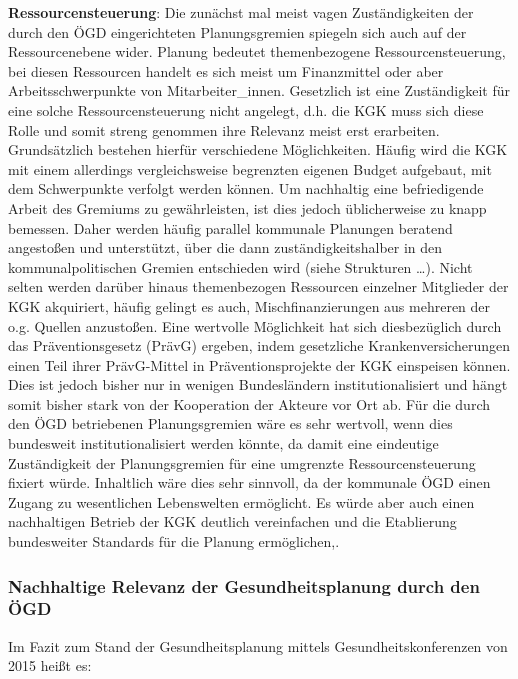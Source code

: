 \documentclass{article}
\begin{document}
\textbf{Ressourcensteuerung}: Die zunächst mal meist vagen Zuständigkeiten der durch den ÖGD eingerichteten Planungsgremien spiegeln sich auch auf der Ressourcenebene wider\autocite{Hollederer2014}. Planung bedeutet themenbezogene Ressourcensteuerung, bei diesen Ressourcen handelt es sich meist um Finanzmittel oder aber Arbeitsschwerpunkte von Mitarbeiter\_innen. Gesetzlich ist eine Zuständigkeit für eine solche Ressourcensteuerung nicht angelegt, d.h. die KGK muss sich diese Rolle und somit streng genommen ihre Relevanz meist erst erarbeiten. Grundsätzlich bestehen hierfür verschiedene Möglichkeiten. Häufig wird die KGK mit einem allerdings vergleichsweise begrenzten eigenen Budget aufgebaut, mit dem Schwerpunkte verfolgt werden können. Um nachhaltig eine befriedigende Arbeit des Gremiums zu gewährleisten, ist dies jedoch üblicherweise zu knapp bemessen. Daher werden häufig parallel kommunale Planungen beratend angestoßen und unterstützt, über die dann zuständigkeitshalber in den kommunalpolitischen Gremien entschieden wird (siehe Strukturen …). Nicht selten werden darüber hinaus themenbezogen Ressourcen einzelner Mitglieder der KGK akquiriert, häufig gelingt es auch, Mischfinanzierungen aus mehreren der o.g. Quellen anzustoßen. Eine wertvolle Möglichkeit hat sich diesbezüglich durch das Präventionsgesetz (PrävG) ergeben, indem gesetzliche Krankenversicherungen einen Teil ihrer PrävG-Mittel in Präventionsprojekte der KGK einspeisen können. Dies ist jedoch bisher nur in wenigen Bundesländern institutionalisiert und hängt somit bisher stark von der Kooperation der Akteure vor Ort ab. Für die durch den ÖGD betriebenen Planungsgremien wäre es sehr wertvoll, wenn dies bundesweit institutionalisiert werden könnte, da damit eine eindeutige Zuständigkeit der Planungsgremien für eine umgrenzte Ressourcensteuerung fixiert würde. Inhaltlich wäre dies sehr sinnvoll, da der kommunale ÖGD einen Zugang zu wesentlichen Lebenswelten ermöglicht. Es würde aber auch einen nachhaltigen Betrieb der KGK deutlich vereinfachen und die Etablierung bundesweiter Standards für die Planung ermöglichen\autocite{Szagunundweitere2016},\autocite{Starkeundweitere2018}.


\subsubsection{Nachhaltige Relevanz der Gesundheitsplanung durch den ÖGD}\label{H2024211}



Im Fazit zum Stand der Gesundheitsplanung mittels Gesundheitskonferenzen von 2015 heißt es:
\end{document}
